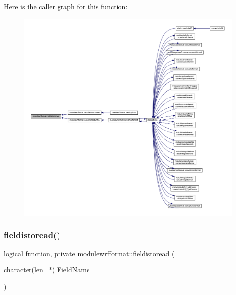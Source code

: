 Here is the caller graph for this function\+:\nopagebreak
\begin{figure}[H]
\begin{center}
\leavevmode
\includegraphics[width=350pt]{namespacemodulewrfformat_a8116c1c7ac79eeffc8e9a9316b030276_icgraph}
\end{center}
\end{figure}
\mbox{\label{namespacemodulewrfformat_a3825823eb49a783934b2270b44729863}} 
\subsubsection{\texorpdfstring{fieldistoread()}{fieldistoread()}}
{\footnotesize\ttfamily logical function, private modulewrfformat\+::fieldistoread (\begin{DoxyParamCaption}\item[{character(len=$\ast$)}]{Field\+Name }\end{DoxyParamCaption})\hspace{0.3cm}{\ttfamily [private]}}

\mbox{\label{namespacemodulewrfformat_aad3ae96f01cad78355724f71c1705c80}} 
